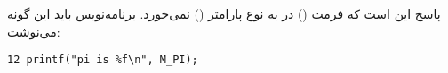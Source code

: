 \section{}
\paragraph{}\label{answer:10}
پاسخ این است که فرمت () در  به نوع پارامتر () نمی‌خورد. برنامه‌نویس باید این گونه می‌نوشت:
\begin{LTR}
            \begin{lstlisting}[style=C++Style]
                12 printf("pi is %f\n", M_PI);
            \end{lstlisting}
\end{LTR}
